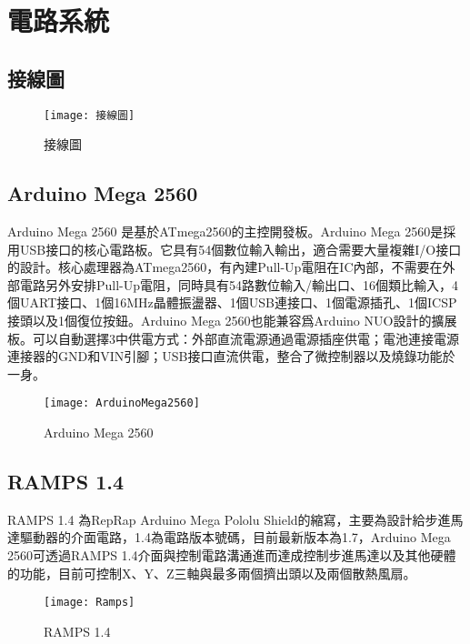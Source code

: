 \chapter{電路系統}

\section{接線圖}

\begin{figure}[hbt!]
\begin{center}
\texttt{[image: 接線圖]}
\caption{\Large 接線圖}\label{接線圖}
\end{center}
\end{figure}

\section{Arduino Mega 2560}
 Arduino Mega 2560 是基於ATmega2560的主控開發板。Arduino Mega 2560是採用USB接口的核心電路板。它具有54個數位輸入輸出，適合需要大量複雜I/O接口的設計。核心處理器為ATmega2560，有內建Pull-Up電阻在IC內部，不需要在外部電路另外安排Pull-Up電阻，同時具有54路數位輸入/輸出口、16個類比輸入，4個UART接口、1個16MHz晶體振盪器、1個USB連接口、1個電源插孔、1個ICSP接頭以及1個復位按鈕。Arduino Mega 2560也能兼容爲Arduino NUO設計的擴展板。可以自動選擇3中供電方式：外部直流電源通過電源插座供電；電池連接電源連接器的GND和VIN引腳；USB接口直流供電，整合了微控制器以及燒錄功能於一身。\\

\begin{figure}[hbt!]
\begin{center}
\texttt{[image: ArduinoMega2560]}
\caption{\Large Arduino Mega 2560}\label{ArduinoMega2560}
\end{center}
\end{figure}

\newpage

\section{RAMPS 1.4}
 RAMPS 1.4 為RepRap Arduino Mega Pololu Shield的縮寫，主要為設計給步進馬達驅動器的介面電路，1.4為電路版本號碼，目前最新版本為1.7，Arduino Mega 2560可透過RAMPS 1.4介面與控制電路溝通進而達成控制步進馬達以及其他硬體的功能，目前可控制X、Y、Z三軸與最多兩個擠出頭以及兩個散熱風扇。\\
\begin{figure}[hbt!]
\begin{center}
\texttt{[image: Ramps]}
\caption{\Large RAMPS 1.4}\label{Ramps}
\end{center}
\end{figure}

